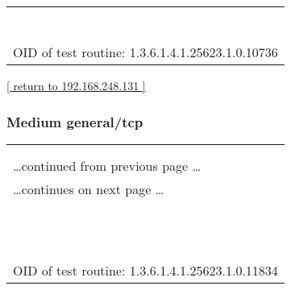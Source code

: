 \documentclass{article}
\begin{document}
\begin{longtable}{|p{}|}
\rowcolor{white}{\verb=Port: 49157/tcp=}\\
\rowcolor{white}{\verb=     UUID: 367abb81-9844-35f1-ad32-98f038001003, version 2=}\\
\rowcolor{white}{\verb=     Endpoint: ncacn_ip_tcp:192.168.248.131[49157]=}\\
\rowcolor{white}{\verb=Solution : filter incoming traffic to this port(s).=}\\
\rowcolor{white}{\verb==}\\
\rowcolor{white}{\verb==}\\
\\
OID of test routine: 1.3.6.1.4.1.25623.1.0.10736\\
\end{longtable}

\begin{footnotesize}\hyperref[host:192.168.248.131]{[ return to 192.168.248.131 ]}\end{footnotesize}
\subsubsection{Medium general/tcp}
\label{port:192.168.248.131 general/tcp Medium}

\begin{longtable}{|p{}|}
\hline
\rowcolor{openvas_warning}{\color{white}{Medium (CVSS: 3.3) }}\\
\rowcolor{openvas_warning}{\color{white}{NVT: Source routed packets}}\\
\hline
\endfirsthead
\hfill\ldots continued from previous page \ldots \\
\hline
\endhead
\hline
\ldots continues on next page \ldots \\
\endfoot
\hline
\endlastfoot
\\
\rowcolor{white}{\verb= Summary:=}\\
\rowcolor{white}{\verb= The remote host accepts loose source routed IP packets.=}\\
\rowcolor{white}{\verb=The feature was designed for testing purpose.=}\\
\rowcolor{white}{\verb=An attacker may use it to circumvent poorly designed IP filtering =}\\
\rowcolor{white}{\verb=and exploit another flaw. However, it is not dangerous by itself.=}\\
\rowcolor{white}{\verb= Solution:=}\\
\rowcolor{white}{\verb= drop source routed packets on this host or on other ingress=}\\
\rowcolor{white}{\verb=routers or firewalls.=}\\
\rowcolor{white}{\verb==}\\
\rowcolor{white}{\verb==}\\
\\
OID of test routine: 1.3.6.1.4.1.25623.1.0.11834\\
\end{longtable}
\end{document}
